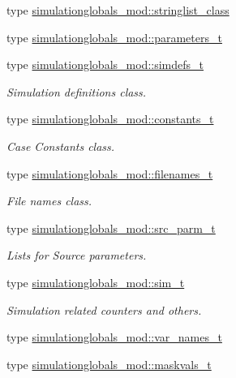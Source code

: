 \begin{DoxyCompactItemize}
\item 
type \mbox{\hyperlink{structsimulationglobals__mod_1_1stringlist__class}{simulationglobals\+\_\+mod\+::stringlist\+\_\+class}}
\item 
type \mbox{\hyperlink{structsimulationglobals__mod_1_1parameters__t}{simulationglobals\+\_\+mod\+::parameters\+\_\+t}}
\item 
type \mbox{\hyperlink{structsimulationglobals__mod_1_1simdefs__t}{simulationglobals\+\_\+mod\+::simdefs\+\_\+t}}
\begin{DoxyCompactList}\small\item\em Simulation definitions class. \end{DoxyCompactList}\item 
type \mbox{\hyperlink{structsimulationglobals__mod_1_1constants__t}{simulationglobals\+\_\+mod\+::constants\+\_\+t}}
\begin{DoxyCompactList}\small\item\em Case Constants class. \end{DoxyCompactList}\item 
type \mbox{\hyperlink{structsimulationglobals__mod_1_1filenames__t}{simulationglobals\+\_\+mod\+::filenames\+\_\+t}}
\begin{DoxyCompactList}\small\item\em File names class. \end{DoxyCompactList}\item 
type \mbox{\hyperlink{structsimulationglobals__mod_1_1src__parm__t}{simulationglobals\+\_\+mod\+::src\+\_\+parm\+\_\+t}}
\begin{DoxyCompactList}\small\item\em Lists for Source parameters. \end{DoxyCompactList}\item 
type \mbox{\hyperlink{structsimulationglobals__mod_1_1sim__t}{simulationglobals\+\_\+mod\+::sim\+\_\+t}}
\begin{DoxyCompactList}\small\item\em Simulation related counters and others. \end{DoxyCompactList}\item 
type \mbox{\hyperlink{structsimulationglobals__mod_1_1var__names__t}{simulationglobals\+\_\+mod\+::var\+\_\+names\+\_\+t}}
\item 
type \mbox{\hyperlink{structsimulationglobals__mod_1_1maskvals__t}{simulationglobals\+\_\+mod\+::maskvals\+\_\+t}}
\item 

\end{DoxyCompactItemize}
